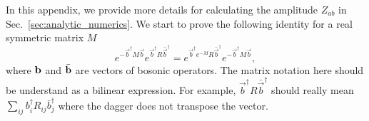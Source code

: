 
In this appendix, we provide more details for calculating the amplitude $Z_{ab}$ in Sec.~\ref{sec:analytic_numerics}. We start to prove the following identity for a real symmetric matrix $M$
\begin{equation}
\label{eq:first_id_app_pf_of_id}
e^{- \vec{b}^{\dagger} M \vec{b} } e^{ \vec{b}^{\dagger} R \bar{\vec{b}}^{\dagger} }  = e^{ \vec{b}^{\dagger} e^{-M}  R \bar{\vec{b}}^{\dagger} } e^{- \vec{b}^{\dagger} M \vec{b} } ,
\end{equation}
where ${\bf b}$ and $\bar{\bf b}$ are vectors of bosonic operators. The matrix notation here should be understand as a bilinear expression. For example, $\vec{b}^{\dagger} R \bar{\vec{b}}^{\dagger}$ should really mean $\sum_{ij}b^\dagger_iR_{ij}\bar{b}_j^\dagger$ where the dagger does not transpose the vector.  

